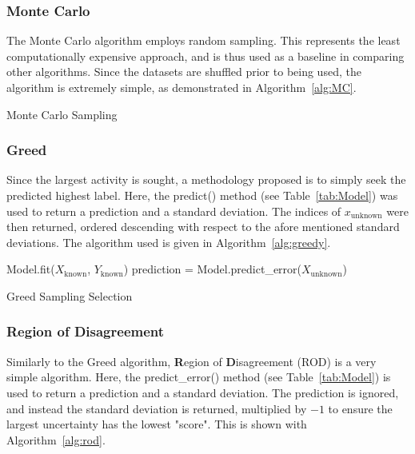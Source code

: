 \subsubsection{Monte Carlo}
The Monte Carlo algorithm employs random sampling. This represents the least computationally expensive approach, and is thus used as a baseline in comparing other algorithms. Since the datasets are shuffled prior to being used, the algorithm is extremely simple, as demonstrated in Algorithm~\ref{alg:MC}.

\begin{algorithm}[H]
    \caption{Monte Carlo Sampling}
    \label{alg:MC}\SetAlgoLined
\end{algorithm}

\subsubsection{Greed}
Since the largest activity is sought, a methodology proposed is to simply seek the predicted highest label. Here, the predict() method (see Table~\ref{tab:Model}) was used to return a prediction and a standard deviation. The indices of $x_\mathrm{unknown}$ were then returned, ordered descending with respect to the afore mentioned standard deviations. The algorithm used is given in Algorithm~\ref{alg:greedy}.

\begin{algorithm}[H]
    Model.fit($X_\mathrm{known}$, $Y_\mathrm{known}$)\;
    prediction = Model.predict\_error($X_\mathrm{unknown}$)\;
    \caption{Greed Sampling Selection}
    \label{alg:greedy}\SetAlgoLined
\end{algorithm}

\subsubsection{Region of Disagreement}
Similarly to the Greed algorithm, \textbf{R}egion of \textbf{D}isagreement (ROD) is a very simple algorithm. Here, the predict\_error() method (see Table~\ref{tab:Model}) is used to return a prediction and a standard deviation. The prediction is ignored, and instead the standard deviation is returned, multiplied by $-1$ to ensure the largest uncertainty has the lowest "score". This is shown with Algorithm~\ref{alg:rod}.


